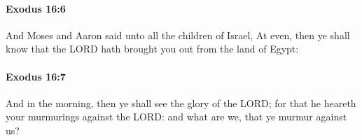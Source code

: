 		\paragraph{Exodus 16:6} %
			\label{EXODUS-16-6}

			And Moses and Aaron said unto all the children of Israel, At even, then ye shall know that the LORD hath brought you out from the land of Egypt:


		\paragraph{Exodus 16:7} %
			\label{EXODUS-16-7}

			And in the morning, then ye shall see the glory of the LORD; for that he heareth your murmurings against the LORD: and what are we, that ye murmur against us?


